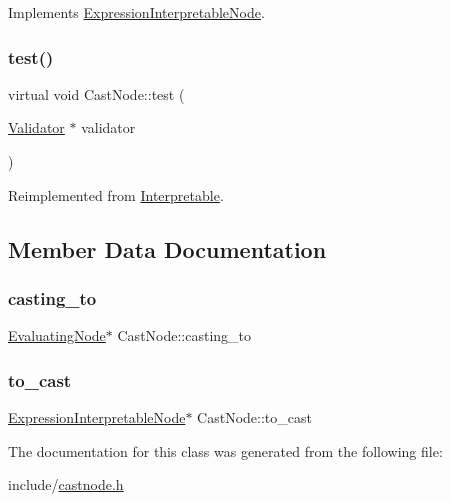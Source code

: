 Implements \hyperlink{classExpressionInterpretableNode_a43650f046c48fc539f77a207e3c9181e}{Expression\+Interpretable\+Node}.

\mbox{\label{classCastNode_a19fa03c324a6dcbadac32965a86afb3e}} 
\subsubsection{\texorpdfstring{test()}{test()}}
{\footnotesize\ttfamily virtual void Cast\+Node\+::test (\begin{DoxyParamCaption}\item[{\hyperlink{classValidator}{Validator} $\ast$}]{validator }\end{DoxyParamCaption})\hspace{0.3cm}{\ttfamily [virtual]}}



Reimplemented from \hyperlink{classInterpretable_a32f547aaf68dcbab993284d3257ab010}{Interpretable}.



\subsection{Member Data Documentation}
\mbox{\label{classCastNode_adc7612dd690f94026adeea0d98970b57}} 
\subsubsection{\texorpdfstring{casting\+\_\+to}{casting\_to}}
{\footnotesize\ttfamily \hyperlink{classEvaluatingNode}{Evaluating\+Node}$\ast$ Cast\+Node\+::casting\+\_\+to}

\mbox{\label{classCastNode_a01fc0556ce65230a77941f1519b72769}} 
\subsubsection{\texorpdfstring{to\+\_\+cast}{to\_cast}}
{\footnotesize\ttfamily \hyperlink{classExpressionInterpretableNode}{Expression\+Interpretable\+Node}$\ast$ Cast\+Node\+::to\+\_\+cast}



The documentation for this class was generated from the following file\+:\begin{DoxyCompactItemize}
\item 
include/\hyperlink{castnode_8h}{castnode.\+h}\end{DoxyCompactItemize}
